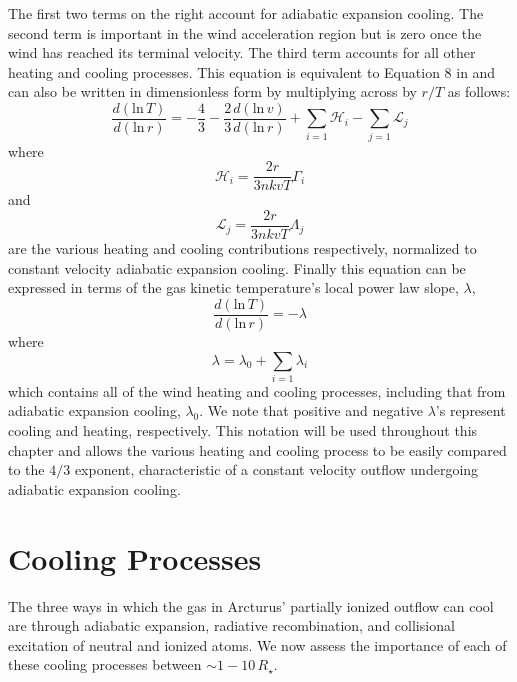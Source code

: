 The first two terms on the right account for adiabatic expansion cooling. The second term is important in the wind acceleration region but is zero once the wind has reached its terminal velocity. The third term accounts for all other heating and cooling processes. This equation is equivalent to Equation 8 in \cite{goldreich_1976} and can also be written in dimensionless form \citep{rodgers_1991} by multiplying across by $r/T$ as follows:
\begin{equation} 
\label{eq:7.8}
\frac{d(\mathrm{ln}\,T)}{d(\mathrm{ln}\,r)}=-\frac{4}{3}-\frac{2}{3}\frac{d(\mathrm{ln}\,v)}{d(\mathrm{ln}\,r)}+\displaystyle\sum_{i=1}\mathcal{H}_{i}-\displaystyle\sum_{j=1}\mathcal{L}_{j}
\end{equation} 
where 
\begin{equation}
\mathcal{H}_{i}=\frac{2r}{3nkvT}\Gamma_{i} 
\end{equation} 
and 
\begin{equation}
\label{eq:1.10}
\mathcal{L}_{j}=\frac{2r}{3nkvT}\Lambda_{j}
\end{equation} 
are the various heating and cooling contributions respectively, normalized to constant velocity adiabatic expansion cooling. Finally this equation can be expressed in terms of the gas kinetic temperature's local power law slope, $\lambda$, 
\begin{equation} \label{eq:lambda}
\frac{d(\mathrm{ln}\,T)}{d(\mathrm{ln}\,r)}=-\lambda
\end{equation}
where 
\begin{equation}
\lambda =\lambda_{0}+\displaystyle\sum_{i=1}\lambda_{i}
\end{equation} 
which contains all of the wind heating and cooling processes, including that from adiabatic expansion cooling, $\lambda_{0}$. We note that positive and negative $\lambda$'s represent cooling and heating, respectively. This notation will be used throughout this chapter and allows the various heating and cooling process to be easily compared to the $4/3$ exponent, characteristic of a constant velocity outflow undergoing adiabatic expansion cooling.

\section{Cooling Processes}\label{sec:7.3}
The three ways in which the gas in Arcturus' partially ionized outflow can cool are through adiabatic expansion, radiative recombination, and collisional excitation of neutral and ionized atoms. We now assess the importance of each of these cooling processes between $\sim 1-10\,R_{\star}$. 

